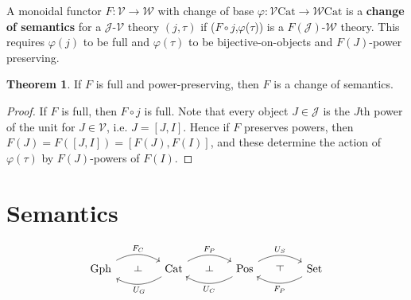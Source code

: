 \documentclass[a4paper,UKenglish]{article}
\theoremstyle{definition}
\newtheorem{theorem}{Theorem}
\def\rd{\rotatebox[origin=c]{90}{$\dashv$}} %
\def\ld{\rotatebox[origin=c]{-90}{$\dashv$}} %
\newcommand{\Gph}{\mathrm{Gph}}
\newcommand{\Set}{\mathrm{Set}}
\newcommand{\Cat}{\mathrm{Cat}}
\newcommand{\Pos}{\mathrm{Pos}}
\newcommand{\V}{\mathscr{V}}
\newcommand{\W}{\mathscr{W}}
\newcommand{\J}{\mathscr{J}}
\begin{document}
A monoidal functor $F:\V \to \W$ with change of base $\varphi:\V\Cat \to \W\Cat$ is a \textbf{change of semantics} for a $\J$-$\V$ theory $(j,\tau)$ if ($F\circ j$,$\varphi$($\tau$)) is a $F(\J)$-$\W$ theory. This requires $\varphi(j)$ to be full and $\varphi(\tau)$ to be bijective-on-objects and $F(J)$-power preserving.

\theoremstyle{theorem}
\begin{theorem}
	If $F$ is full and power-preserving, then $F$ is a change of semantics.
\end{theorem}
\begin{proof}
	If $F$ is full, then $F\circ j$ is full. Note that every object $J\in \J$ is the $J$th power of the unit for $J\in\V$, i.e. $J = [J,I]$. Hence if $F$ preserves powers, then $F(J) = F([J,I]) = [F(J),F(I)]$, and these determine the action of $\varphi(\tau)$ by $F(J)$-powers of $F(I)$.
\end{proof}

\section{Semantics}
\[
\begin{tikzcd}[column sep=small]
\Gph \arrow[bend left,below]{rr}{F_C}
& \ld &
\arrow[bend left,above]{ll}{U_G} \Cat \arrow[bend left,below]{rr}{F_P}
& \ld &
\arrow[bend left,above]{ll}{U_C} \Pos \arrow[bend left,below]{rr}{U_S}
& \rd &
\Set \arrow[bend left,above]{ll}{F_P}
\end{tikzcd}
\]



\end{document}
